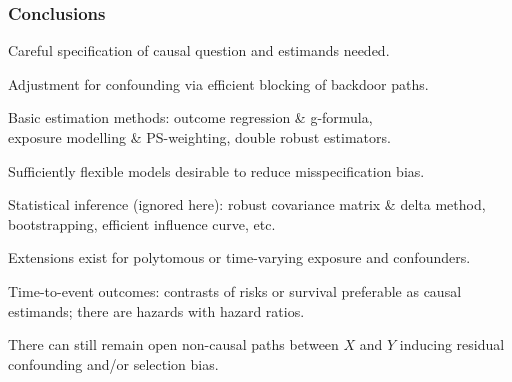 \documentclass[12pt,dvipsnames,t,aspectratio=169, handout%
]{beamer}
\begin{document}
\begin{frame}
\frametitle{\large Conclusions}

\bi
\item 
Careful specification of causal question and estimands needed.
\pause
\medskip
\item 
Adjustment for confounding via efficient blocking of backdoor paths.
\pause
\medskip
\item
Basic estimation methods: outcome regression \& g-formula, \\ 
exposure modelling \& PS-weighting, double robust estimators.
\pause 
\medskip
\item
Sufficiently flexible models desirable to reduce misspecification bias.
\pause
\medskip
\item 
Statistical inference (ignored here): robust covariance matrix \& delta method, bootstrapping,
efficient influence curve, etc.  
\pause
\medskip
\item
Extensions exist for
 polytomous or time-varying exposure and confounders.
 \pause
 \medskip
\item
Time-to-event outcomes: contrasts of risks or survival preferable as causal estimands; 
there are hazards with hazard ratios.  
\pause
\medskip
 \item
There can still remain open non-causal paths between $X$ and $Y$ 
inducing residual confounding and/or selection bias.
\ei

\end{frame}
\end{document}
